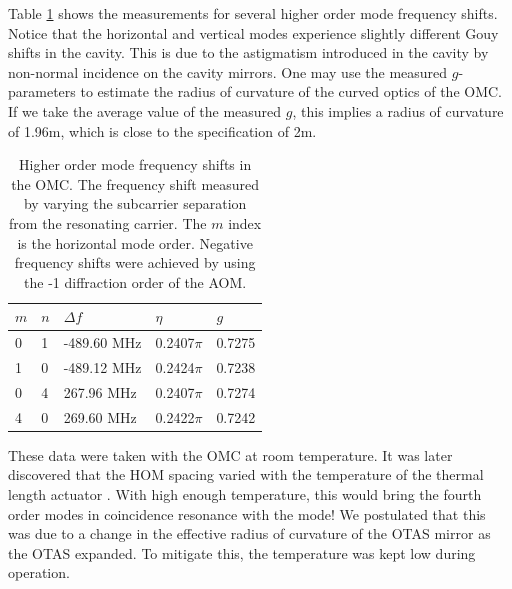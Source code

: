 Table \ref{tab:HOM} shows the measurements for several higher order mode frequency shifts. %
Notice that the horizontal and vertical modes experience slightly different Gouy shifts in the cavity. %
This is due to the astigmatism introduced in the cavity by non-normal incidence on the cavity mirrors. %
One may use the measured $g$-parameters to estimate the radius of curvature of the curved optics of the OMC. %
If we take the average value of the measured $g$, this implies a radius of curvature of 1.96m, which is close to the specification of 2m.

\begin{table}
  \begin{center}
    \begin{tabular}{lll|ll}
      \hline
      $m$ & $n$ & $\Delta f$ & $\eta$ & $g$ \\
      \hline
      0 & 1 & -489.60 MHz & 0.2407$\pi$ & 0.7275\\
      1 & 0 & -489.12 MHz & 0.2424$\pi$ & 0.7238\\
      0 & 4 &  267.96 MHz & 0.2407$\pi$ & 0.7274\\
      4 & 0 &  269.60 MHz & 0.2422$\pi$ & 0.7242\\
      \hline
    \end{tabular}
  \caption[Higher order mode frequency shifts in the OMC]{Higher order mode frequency shifts in the OMC. The frequency shift measured by varying the subcarrier separation from the resonating carrier. The $m$ index is the horizontal mode order. Negative frequency shifts were achieved by using the -1 diffraction order of the AOM.}
  \label{tab:HOM}
  \end{center}
\end{table}

These data were taken with the OMC at room temperature. %
It was later discovered that the HOM spacing varied with the temperature of the thermal length actuator \cite{OTASmodes}. %
With high enough temperature, this would bring the fourth order modes in coincidence resonance with the  mode! %
We postulated that this was due to a change in the effective radius of curvature of the OTAS mirror as the OTAS expanded. %
To mitigate this, the temperature was kept low during operation.

